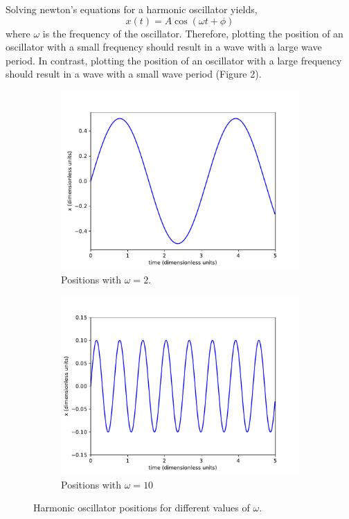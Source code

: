 \documentclass{article}
\newcommand{\be}{\begin{equation}}
\newcommand{\ee}{\end{equation}}
\begin{document}
Solving newton's equations for a harmonic oscillator yields,
\be
  x(t) = A \cos(\omega t + \phi)
\ee
where $\omega$ is the frequency of the oscillator.
Therefore, plotting the position of an oscillator with a small frequency should result in a wave with a large wave period.
In contrast, plotting the position of an oscillator with a large frequency should result in a wave with a small wave period (Figure 2).
\begin{figure}[H]
    \centering
    \begin{subfigure}[b]{0.49\textwidth}
        \includegraphics[width=\textwidth]{Figures/1dverlet/positw2.pdf}
  	\caption{Positions with $\omega = 2$.}
    \end{subfigure}
    \begin{subfigure}[b]{0.49\textwidth}
        \includegraphics[width=\textwidth]{Figures/1dverlet/positw10.pdf}
        \caption{Positions with $\omega = 10$}
    \end{subfigure}
    \caption{Harmonic oscillator positions for different values of $\omega$.}
\end{figure}
\end{document}
